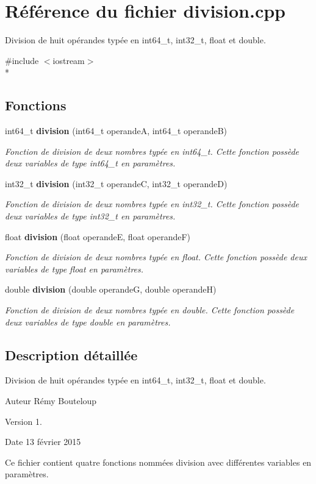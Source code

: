 \section{Référence du fichier division.\-cpp}
\label{division_8cpp}


Division de huit opérandes typée en int64\-\_\-t, int32\-\_\-t, float et double.  


{\ttfamily \#include $<$iostream$>$}\\*
\subsection*{Fonctions}
\begin{DoxyCompactItemize}
\item 
int64\-\_\-t {\bf division} (int64\-\_\-t operande\-A, int64\-\_\-t operande\-B)
\begin{DoxyCompactList}\small\item\em Fonction de division de deux nombres typée en int64\-\_\-t. Cette fonction possède deux variables de type int64\-\_\-t en paramètres. \end{DoxyCompactList}\item 
int32\-\_\-t {\bf division} (int32\-\_\-t operande\-C, int32\-\_\-t operande\-D)
\begin{DoxyCompactList}\small\item\em Fonction de division de deux nombres typée en int32\-\_\-t. Cette fonction possède deux variables de type int32\-\_\-t en paramètres. \end{DoxyCompactList}\item 
float {\bf division} (float operande\-E, float operande\-F)
\begin{DoxyCompactList}\small\item\em Fonction de division de deux nombres typée en float. Cette fonction possède deux variables de type float en paramètres. \end{DoxyCompactList}\item 
double {\bf division} (double operande\-G, double operande\-H)
\begin{DoxyCompactList}\small\item\em Fonction de division de deux nombres typée en double. Cette fonction possède deux variables de type double en paramètres. \end{DoxyCompactList}\end{DoxyCompactItemize}


\subsection{Description détaillée}
Division de huit opérandes typée en int64\-\_\-t, int32\-\_\-t, float et double. \begin{DoxyAuthor}{Auteur}
Rémy Bouteloup 
\end{DoxyAuthor}
\begin{DoxyVersion}{Version}
1. 
\end{DoxyVersion}
\begin{DoxyDate}{Date}
13 février 2015
\end{DoxyDate}
Ce fichier contient quatre fonctions nommées division avec différentes variables en paramètres. 

